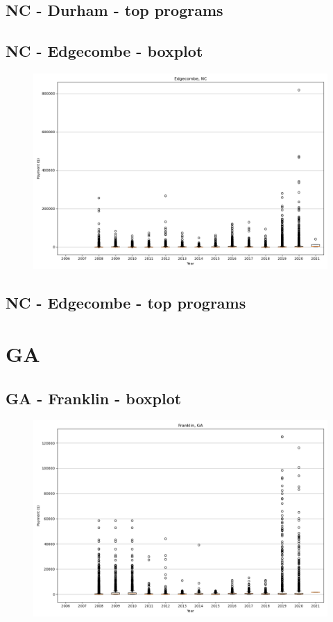 \subsection*{NC - Durham - top programs}

\newpage
\subsection*{NC - Edgecombe - boxplot}
\begin{figure}[h]
\centering
\includegraphics[width=7in]{../output/boxplots/counties/Edgecombe-NC_boxplot.png}
\end{figure}


\subsection*{NC - Edgecombe - top programs}

\newpage
\section*{GA}
\subsection*{GA - Franklin - boxplot}
\begin{figure}[h]
\centering
\includegraphics[width=7in]{../output/boxplots/counties/Franklin-GA_boxplot.png}
\end{figure}


